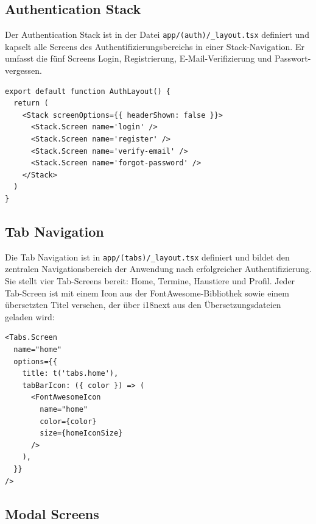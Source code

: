 \subsection{Authentication Stack}

Der Authentication Stack ist in der Datei \texttt{app/(auth)/\_layout.tsx} definiert und kapselt alle Screens des Authentifizierungsbereichs in einer Stack-Navigation. Er umfasst die fünf Screens Login, Registrierung, E-Mail-Verifizierung und Passwort-vergessen.

\begin{listing}[H]
\begin{verbatim}
export default function AuthLayout() {
  return (
    <Stack screenOptions={{ headerShown: false }}>
      <Stack.Screen name='login' />
      <Stack.Screen name='register' />
      <Stack.Screen name='verify-email' />
      <Stack.Screen name='forgot-password' />
    </Stack>
  )
}
\end{verbatim}
\caption{Authentication Stack in app/(auth)/\_layout.tsx}
\label{lst:auth-layout}
\end{listing}

\subsection{Tab Navigation}

Die Tab Navigation ist in \texttt{app/(tabs)/\_layout.tsx} definiert und bildet den zentralen Navigationsbereich der Anwendung nach erfolgreicher Authentifizierung. Sie stellt vier Tab-Screens bereit: Home, Termine, Haustiere und Profil. Jeder Tab-Screen ist mit einem Icon aus der FontAwesome-Bibliothek sowie einem übersetzten Titel versehen, der über i18next aus den Übersetzungsdateien geladen wird:

\begin{listing}[H]
\begin{verbatim}
<Tabs.Screen
  name="home"
  options={{
    title: t('tabs.home'),
    tabBarIcon: ({ color }) => (
      <FontAwesomeIcon 
        name="home" 
        color={color} 
        size={homeIconSize} 
      />
    ),
  }}
/>
\end{verbatim}
\caption{Definition eines Tab-Screens mit Icon und Übersetzung}
\label{lst:tab-screen}
\end{listing}

\subsection{Modal Screens}

